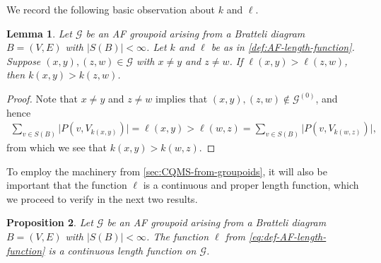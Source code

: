 \documentclass[11pt,a4paper,oneside,final,reqno]{amsart}
\newtheorem{lemma}{Lemma}[section]
\newtheorem{proposition}[lemma]{Proposition}
\theoremstyle{definition}
\newcommand{\G}{\mathcal{G}}
\newcommand{\Go}{\mathcal{G}^{(0)}}
\numberwithin{equation}{section}
\begin{document}
	We record the following basic observation about $k$ and $\ell$. 

	
	\begin{lemma}\label{lemma:relating-ell-and-k}
		Let $\G$ be an AF groupoid arising from a Bratteli diagram $B = (V,E)$ with $\vert S(B)\vert < \infty$. 
		Let $k$ and $\ell$ be as in \cref{def:AF-length-function}. 
		Suppose $(x,y), (z,w) \in \G$ with $x\neq y$ and $z\neq w$. If $\ell(x,y) > \ell(z,w)$, then $k(x,y) > k(z,w)$. 
	\end{lemma}
	
	\begin{proof}
		Note that $x\neq y$ and $z\neq w$ implies that $(x,y), (z,w) \not\in \Go$, and hence
		\begin{align*}
			 \sum_{v \in S(B)} \vert P(v,V_{k(x,y)}) \vert = \ell(x,y) > \ell(w,z) =  \sum_{v \in S(B)} \vert P(v,V_{k(w,z)}) \vert,
		\end{align*} 
		from which we see that $k(x,y) > k(w,z)$. 
	\end{proof}
	


	To employ the machinery from \cref{sec:CQMS-from-groupoids}, it will also be important that the function $\ell$ is a continuous and proper length function, which we proceed to verify in the next two results. 
	
	\begin{proposition}\label{prop:ellB-is-cont-length-function}
		Let $\G$ be an AF groupoid arising from a Bratteli diagram $B = (V,E)$ with $\vert S(B)\vert < \infty$.  
		The function $\ell$ from \eqref{eq:def-AF-length-function} 
		is a continuous length function on 
		$\G$.  
	\end{proposition}
	
\end{document}
